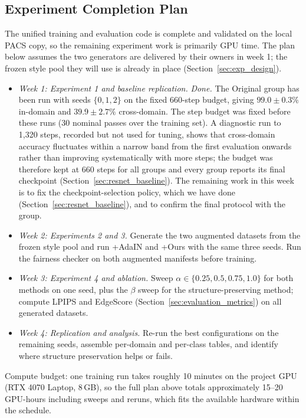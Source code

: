 \subsection{Experiment Completion Plan}
\label{sec:completion_plan}

The unified training and evaluation code is complete and validated on the local PACS copy, so the remaining experiment work is primarily GPU time. The plan below assumes the two generators are delivered by their owners in week 1; the frozen style pool they will use is already in place (Section~\ref{sec:exp_design}).

\begin{itemize}
\item \textit{Week 1: Experiment 1 and baseline replication.} \textit{Done.} The Original group has been run with seeds $\{0,1,2\}$ on the fixed 660-step budget, giving $99.0\pm0.3\%$ in-domain and $39.9\pm2.7\%$ cross-domain. The step budget was fixed before these runs (30 nominal passes over the training set). A diagnostic run to 1{,}320 steps, recorded but not used for tuning, shows that cross-domain accuracy fluctuates within a narrow band from the first evaluation onwards rather than improving systematically with more steps; the budget was therefore kept at 660 steps for all groups and every group reports its final checkpoint (Section~\ref{sec:resnet_baseline}). The remaining work in this week is to fix the checkpoint-selection policy, which we have done (Section~\ref{sec:resnet_baseline}), and to confirm the final protocol with the group.
\item \textit{Week 2: Experiments 2 and 3.} Generate the two augmented datasets from the frozen style pool and run +AdaIN and +Ours with the same three seeds. Run the fairness checker on both augmented manifests before training.
\item \textit{Week 3: Experiment 4 and ablation.} Sweep $\alpha \in \{0.25, 0.5, 0.75, 1.0\}$ for both methods on one seed, plus the $\beta$ sweep for the structure-preserving method; compute LPIPS and EdgeScore (Section~\ref{sec:evaluation_metrics}) on all generated datasets.
\item \textit{Week 4: Replication and analysis.} Re-run the best configurations on the remaining seeds, assemble per-domain and per-class tables, and identify where structure preservation helps or fails.
\end{itemize}

Compute budget: one training run takes roughly 10 minutes on the project GPU (RTX 4070 Laptop, 8\,GB), so the full plan above totals approximately 15--20 GPU-hours including sweeps and reruns, which fits the available hardware within the schedule.

